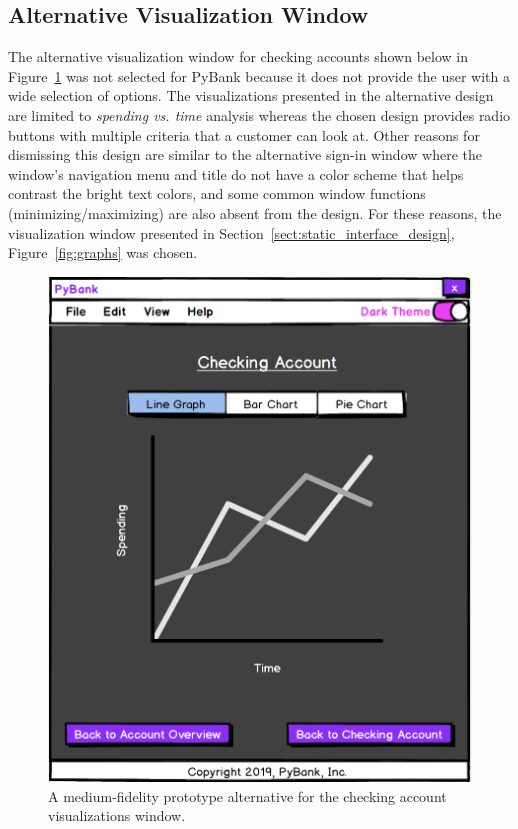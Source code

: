\newpage

\subsection{Alternative Visualization Window}
\label{sect:alt_visualization}

The alternative visualization window for checking accounts shown below in Figure~\ref{fig:alt_visualization_diagram} was not selected for PyBank because it does not provide the user with a wide selection of options. The visualizations presented in the alternative design are limited to \emph{spending vs. time} analysis whereas the chosen design provides radio buttons with multiple criteria that a customer can look at. Other reasons for dismissing this design are similar to the alternative sign-in window where the window's navigation menu and title do not have a color scheme that helps contrast the bright text colors, and some common window functions (minimizing/maximizing) are also absent from the design. For these reasons, the visualization window presented in Section~\ref{sect:static_interface_design}, Figure~\ref{fig:graphs} was chosen.

\begin{figure}[H]
	\begin{centering}
	\includegraphics[width=0.55\linewidth, height=0.70\linewidth]{figures/alternative_visualization_design.png}
	\caption{A medium-fidelity prototype alternative for the checking account visualizations window.}
	\label{fig:alt_visualization_diagram}
	\end{centering}
\end{figure}

